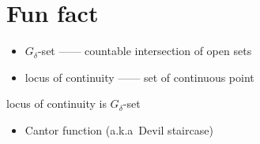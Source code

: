 \section{Fun fact}\label{sec:fun-fact}

\begin{itemize}
    \item $G_\delta$-set ------ countable intersection of open sets
    \item locus of continuity ------ set of continuous point
\end{itemize}

\begin{fact}
    locus of continuity is $G_\delta$-set
\end{fact}

\begin{itemize}
    \item Cantor function (a.k.a\ Devil staircase)
\end{itemize}